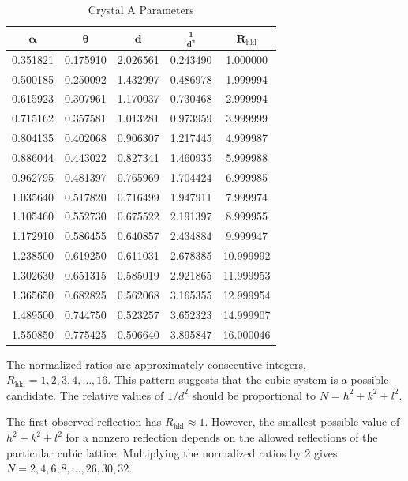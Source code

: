 \documentclass[12pt]{article}
\begin{document}
\begin{table}[ht]
    \centering
    \caption{Crystal A Parameters}
    \label{tab:crystal_A}
    \begin{tabular}{ccccc}
        \toprule
        $\mathbf{\alpha}$ & $\mathbf{\theta}$ & $\mathbf{d}$ & $\mathbf{\frac{1}{d^2}}$ & $\mathbf{R_{\mathrm{hkl}}}$ \\
        \midrule
        0.351821 & 0.175910 & 2.026561 & 0.243490 & 1.000000 \\
        0.500185 & 0.250092 & 1.432997 & 0.486978 & 1.999994 \\
        0.615923 & 0.307961 & 1.170037 & 0.730468 & 2.999994 \\
        0.715162 & 0.357581 & 1.013281 & 0.973959 & 3.999999 \\
        0.804135 & 0.402068 & 0.906307 & 1.217445 & 4.999987 \\
        0.886044 & 0.443022 & 0.827341 & 1.460935 & 5.999988 \\
        0.962795 & 0.481397 & 0.765969 & 1.704424 & 6.999985 \\
        1.035640 & 0.517820 & 0.716499 & 1.947911 & 7.999974 \\
        1.105460 & 0.552730 & 0.675522 & 2.191397 & 8.999955 \\
        1.172910 & 0.586455 & 0.640857 & 2.434884 & 9.999947 \\
        1.238500 & 0.619250 & 0.611031 & 2.678385 & 10.999992 \\
        1.302630 & 0.651315 & 0.585019 & 2.921865 & 11.999953 \\
        1.365650 & 0.682825 & 0.562068 & 3.165355 & 12.999954 \\
        1.489500 & 0.744750 & 0.523257 & 3.652323 & 14.999907 \\
        1.550850 & 0.775425 & 0.506640 & 3.895847 & 16.000046 \\
        \bottomrule
    \end{tabular}
\end{table}

The normalized ratios are approximately consecutive integers, $R_{\mathrm{hkl}} = 1, 2, 3, 4, \dots, 16$. 
This pattern suggests that the cubic system is a possible candidate. The relative values of $1/d^2$ should be proportional to $N=h^2+k^2+l^2$. 

The first observed reflection has $R_{\mathrm{hkl}}\approx1$. However, the smallest possible value of $h^2+k^2+l^2$ for a nonzero reflection depends on the allowed reflections of the particular cubic lattice. Multiplying the normalized ratios by 2 gives $N = 2, 4, 6, 8, \dots, 26, 30, 32$.
\end{document}
